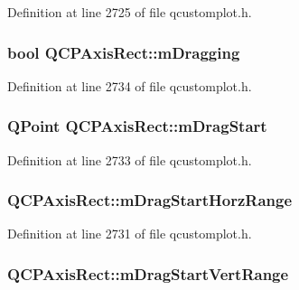 Definition at line 2725 of file qcustomplot.\-h.

\hypertarget{class_q_c_p_axis_rect_ab49a6698194cf0e9e38a1d734c0888a8}{
\subsubsection[{m\-Dragging}]{\setlength{\rightskip}{0pt plus 5cm}bool Q\-C\-P\-Axis\-Rect\-::m\-Dragging\hspace{0.3cm}{\ttfamily [protected]}}}\label{class_q_c_p_axis_rect_ab49a6698194cf0e9e38a1d734c0888a8}


Definition at line 2734 of file qcustomplot.\-h.

\hypertarget{class_q_c_p_axis_rect_a032896b28f83a58010d8d533b78c49df}{
\subsubsection[{m\-Drag\-Start}]{\setlength{\rightskip}{0pt plus 5cm}Q\-Point Q\-C\-P\-Axis\-Rect\-::m\-Drag\-Start\hspace{0.3cm}{\ttfamily [protected]}}}\label{class_q_c_p_axis_rect_a032896b28f83a58010d8d533b78c49df}


Definition at line 2733 of file qcustomplot.\-h.

\hypertarget{class_q_c_p_axis_rect_a41936cf473ec638bec382f5a40cdb1f3}{
\subsubsection[{m\-Drag\-Start\-Horz\-Range}]{ Q\-C\-P\-Axis\-Rect\-::m\-Drag\-Start\-Horz\-Range\hspace{0.3cm}{\ttfamily [protected]}}}\label{class_q_c_p_axis_rect_a41936cf473ec638bec382f5a40cdb1f3}


Definition at line 2731 of file qcustomplot.\-h.

\hypertarget{class_q_c_p_axis_rect_a1a5ae4c74b8bd46baf91bf4e4f4165f0}{
\subsubsection[{m\-Drag\-Start\-Vert\-Range}]{ Q\-C\-P\-Axis\-Rect\-::m\-Drag\-Start\-Vert\-Range\hspace{0.3cm}{\ttfamily [protected]}}}\label{class_q_c_p_axis_rect_a1a5ae4c74b8bd46baf91bf4e4f4165f0}


